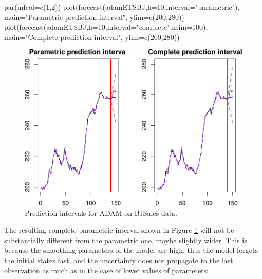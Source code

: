 \documentclass[
]{book}
\newenvironment{Shaded}{\begin{snugshade}}{\end{snugshade}}
\newcommand{\AttributeTok}[1]{\textcolor[rgb]{0.77,0.63,0.00}{#1}}
\newcommand{\DecValTok}[1]{\textcolor[rgb]{0.00,0.00,0.81}{#1}}
\newcommand{\FunctionTok}[1]{\textcolor[rgb]{0.00,0.00,0.00}{#1}}
\newcommand{\NormalTok}[1]{#1}
\newcommand{\StringTok}[1]{\textcolor[rgb]{0.31,0.60,0.02}{#1}}
\theoremstyle{definition}
\theoremstyle{definition}
\theoremstyle{definition}
\theoremstyle{definition}
\theoremstyle{remark}
\begin{document}
\begin{Shaded}
\begin{Highlighting}[]
\FunctionTok{par}\NormalTok{(}\AttributeTok{mfcol=}\FunctionTok{c}\NormalTok{(}\DecValTok{1}\NormalTok{,}\DecValTok{2}\NormalTok{))}
\FunctionTok{plot}\NormalTok{(}\FunctionTok{forecast}\NormalTok{(adamETSBJ,}\AttributeTok{h=}\DecValTok{10}\NormalTok{,}\AttributeTok{interval=}\StringTok{"parametric"}\NormalTok{),}
     \AttributeTok{main=}\StringTok{"Parametric prediction interval"}\NormalTok{, }\AttributeTok{ylim=}\FunctionTok{c}\NormalTok{(}\DecValTok{200}\NormalTok{,}\DecValTok{280}\NormalTok{))}
\FunctionTok{plot}\NormalTok{(}\FunctionTok{forecast}\NormalTok{(adamETSBJ,}\AttributeTok{h=}\DecValTok{10}\NormalTok{,}\AttributeTok{interval=}\StringTok{"complete"}\NormalTok{,}\AttributeTok{nsim=}\DecValTok{100}\NormalTok{),}
     \AttributeTok{main=}\StringTok{"Complete prediction interval"}\NormalTok{, }\AttributeTok{ylim=}\FunctionTok{c}\NormalTok{(}\DecValTok{200}\NormalTok{,}\DecValTok{280}\NormalTok{))}
\end{Highlighting}
\end{Shaded}

\begin{figure}
\centering
\includegraphics{Svetunkov--2022----ADAM_files/figure-latex/adamModelPIComplete-1.pdf}
\caption{\label{fig:adamModelPIComplete}Prediction intervals for ADAM on BJSales data.}
\end{figure}

The resulting complete parametric interval shown in Figure \ref{fig:adamModelPIComplete} will not be substantially different from the parametric one, maybe slightly wider. This is because the smoothing parameters of the model are high, thus the model forgets the initial states fast, and the uncertainty does not propagate to the last observation as much as in the case of lower values of parameters:
\end{document}
